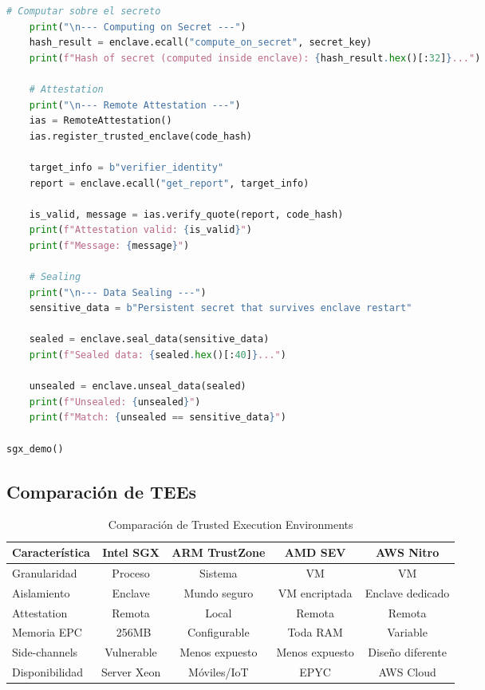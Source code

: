 \documentclass[11pt,a4paper,twoside]{book}
\theoremstyle{definition}
\theoremstyle{remark}
\begin{document}
\begin{lstlisting}[language=Python, caption={Simulación conceptual de operaciones SGX}]
    # Computar sobre el secreto
    print("\n--- Computing on Secret ---")
    hash_result = enclave.ecall("compute_on_secret", secret_key)
    print(f"Hash of secret (computed inside enclave): {hash_result.hex()[:32]}...")
    
    # Attestation
    print("\n--- Remote Attestation ---")
    ias = RemoteAttestation()
    ias.register_trusted_enclave(code_hash)
    
    target_info = b"verifier_identity"
    report = enclave.ecall("get_report", target_info)
    
    is_valid, message = ias.verify_quote(report, code_hash)
    print(f"Attestation valid: {is_valid}")
    print(f"Message: {message}")
    
    # Sealing
    print("\n--- Data Sealing ---")
    sensitive_data = b"Persistent secret that survives enclave restart"
    
    sealed = enclave.seal_data(sensitive_data)
    print(f"Sealed data: {sealed.hex()[:40]}...")
    
    unsealed = enclave.unseal_data(sealed)
    print(f"Unsealed: {unsealed}")
    print(f"Match: {unsealed == sensitive_data}")

sgx_demo()
\end{lstlisting}

\subsection{Comparación de TEEs}

\begin{table}[htbp]
\centering
\footnotesize
\begin{tabular}{lcccc}
\toprule
\textbf{Característica} & \textbf{Intel SGX} & \textbf{ARM TrustZone} & \textbf{AMD SEV} & \textbf{AWS Nitro} \\
\midrule
Granularidad & Proceso & Sistema & VM & VM \\
Aislamiento & Enclave & Mundo seguro & VM encriptada & Enclave dedicado \\
Attestation & Remota & Local & Remota & Remota \\
Memoria EPC & ~256MB & Configurable & Toda RAM & Variable \\
Side-channels & Vulnerable & Menos expuesto & Menos expuesto & Diseño diferente \\
Disponibilidad & Server Xeon & Móviles/IoT & EPYC & AWS Cloud \\
\bottomrule
\end{tabular}
\caption{Comparación de Trusted Execution Environments}
\end{table}
\end{document}
